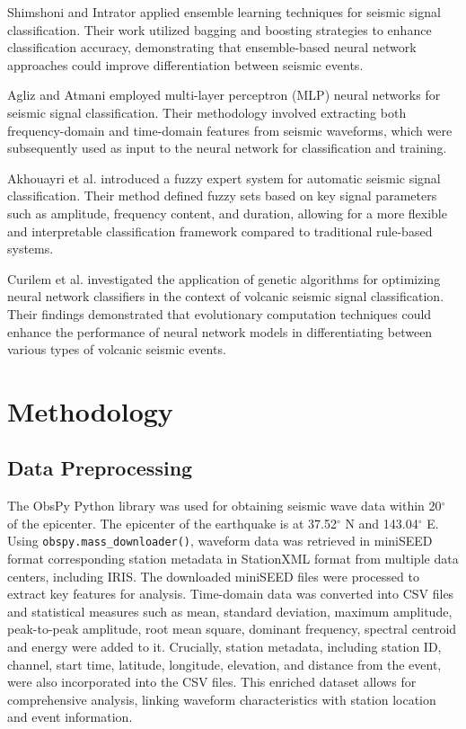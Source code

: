 \documentclass[conference]{IEEEtran}
\begin{document}
Shimshoni and Intrator \cite{b7} applied
ensemble learning techniques for seismic signal classification. Their work
utilized bagging and boosting strategies to enhance classification accuracy,
demonstrating that ensemble-based neural network approaches could improve
differentiation between seismic events.


Agliz and Atmani \cite{b8} employed
multi-layer perceptron (MLP) neural networks for seismic signal classification.
Their methodology involved extracting both frequency-domain and time-domain
features from seismic waveforms, which were subsequently used as input to the
neural network for classification and training.


Akhouayri et al. \cite{b9}
introduced a fuzzy expert system for automatic seismic signal classification.
Their method defined fuzzy sets based on key signal parameters such as
amplitude, frequency content, and duration, allowing for a more flexible and
interpretable classification framework compared to traditional rule-based
systems.


Curilem et al. \cite{b10} investigated the application of genetic
algorithms for optimizing neural network classifiers in the context of volcanic
seismic signal classification. Their findings demonstrated that evolutionary
computation techniques could enhance the performance of neural network models in
differentiating between various types of volcanic seismic events.
\section{Methodology}
\label{sec:orgb1ea79d}
\subsection{Data Preprocessing}
\label{sec:orge042636}
The ObsPy Python library was used for obtaining seismic wave data within
20\(^{\circ}\) of the epicenter. The epicenter of the earthquake is at
37.52\(^{\circ}\) N and 143.04\(^{\circ}\) E. Using
\texttt{obspy.mass\_downloader()}, waveform data was retrieved in miniSEED
format corresponding station metadata in StationXML format from multiple data
centers, including IRIS. The downloaded miniSEED files were processed to extract
key features for analysis. Time-domain data was converted into CSV files and
statistical measures such as mean, standard deviation, maximum amplitude,
peak-to-peak amplitude, root mean square, dominant frequency, spectral centroid
and energy were added to it. Crucially, station metadata, including station ID,
channel, start time, latitude, longitude, elevation, and distance from the
event, were also incorporated into the CSV files. This enriched dataset allows
for comprehensive analysis, linking waveform characteristics with station
location and event information.
\end{document}
